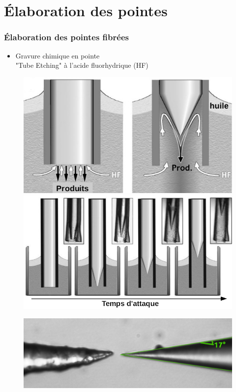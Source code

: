 \documentclass[9pt,a9paper,handout]{beamer}
\begin{document}
\section{Élaboration des pointes}
    \begin{frame}
        \frametitle{Élaboration des pointes fibrées}
        \begin{itemize}
            \item Gravure chimique en pointe\\
            \qquad "Tube Etching" à l'acide fluorhydrique (HF)
        \end{itemize}

        \begin{figure}[h]\centering
            \includegraphics[width=.4\textwidth]{Images/Schemas/gravure}
            \hspace*{3mm}
            \includegraphics[width=.4\textwidth]{Images/Schemas/gravure_2}
        \end{figure}
        \vspace*{1cm}

        \begin{figure}[h]\centering
            \includegraphics[width=.55\textwidth]{Images/PhotosPointes/Nues_ok_et_abimee}
        \end{figure}
        \let\thefootnote\relax{}
    \end{frame}
\end{document}
